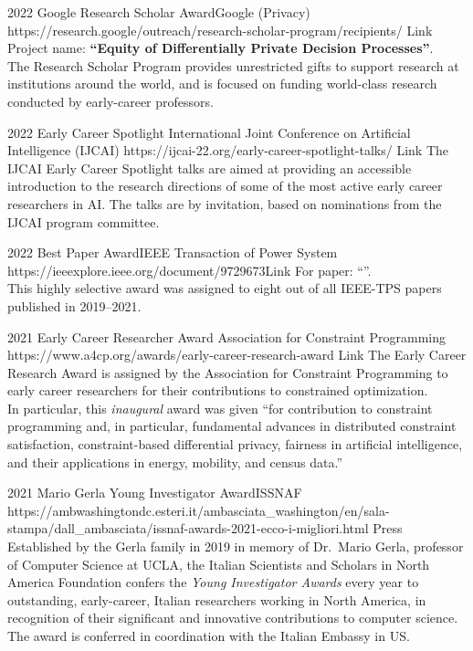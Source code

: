 \begin{awards}
	\awardentryD
	{2022}
	{Google Research Scholar Award}{Google (Privacy)}
	{https://research.google/outreach/research-scholar-program/recipients/}
	{Link}
	{
	Project name: \textbf{``Equity of Differentially Private Decision Processes''}.\\
	The Research Scholar Program provides unrestricted gifts to support research at institutions around the world, and is focused on funding world-class research conducted by early-career professors.
	}

	\awardentryD
	{2022}
	{Early Career Spotlight}%
	{International Joint Conference on Artificial Intelligence (IJCAI)}
	{https://ijcai-22.org/early-career-spotlight-talks/}
	{Link}
	{
	The IJCAI Early Career Spotlight talks are aimed at providing an accessible introduction to the research directions of some of the most active early career researchers in AI.
	The talks are by invitation, based on nominations from the IJCAI program committee.
	}

	\awardentryD
	{2022}
	{Best Paper Award}{IEEE Transaction of Power System}
	{https://ieeexplore.ieee.org/document/9729673}{Link}
	{
	For paper: ``''.\\
	This highly selective award was assigned to eight out of all IEEE-TPS papers published in 2019--2021.}

	\awardentryD
	{2021}
	{Early Career Researcher Award}
	{Association for Constraint Programming}
	{https://www.a4cp.org/awards/early-career-research-award}
	{Link}
	{The Early Career Research Award is assigned by the Association for Constraint Programming to early career researchers for their 
	contributions to constrained optimization.\\
	In particular, this \emph{inaugural} award was given 
	``for contribution to constraint programming and, in particular,
	fundamental advances in distributed constraint satisfaction, constraint-based
	differential privacy, fairness in artificial intelligence, and their 
	applications in energy, mobility, and census data.''}

	\awardentryD
	{2021}
	{Mario Gerla Young Investigator Award}{ISSNAF}
	{https://ambwashingtondc.esteri.it/ambasciata_washington/en/sala-stampa/dall_ambasciata/issnaf-awards-2021-ecco-i-migliori.html}
	{Press}
	{
	Established by the Gerla family in 2019 in memory of Dr.~Mario Gerla, professor of Computer Science at UCLA, the Italian Scientists and Scholars in North America Foundation confers the \emph{Young Investigator Awards} every year to outstanding, early-career, Italian researchers working in North America, in recognition of their significant and innovative contributions to computer science.
	The award is conferred in coordination with the Italian Embassy in US.
	}


\end{awards}
